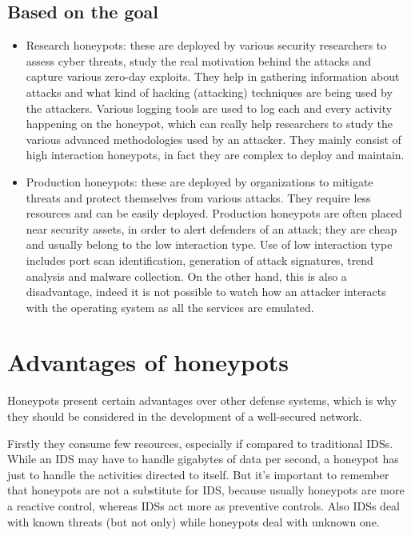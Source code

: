 \documentclass[epsfig,a4paper,11pt,titlepage,oneside,openany]{book}
\begin{document}
\section{Based on the goal}

\begin{itemize}
\item Research honeypots: these are deployed by various security researchers to assess cyber threats, study the real motivation behind the attacks and capture various zero-day exploits. They help in gathering information about attacks and what kind of hacking (attacking) techniques are being used by the attackers. Various logging tools are used to log each and every activity happening on the honeypot, which can really help researchers to study the various advanced methodologies used by an attacker. They mainly consist of high interaction honeypots, in fact they are complex to deploy and maintain.

\item Production honeypots: these are deployed by organizations to mitigate threats and protect themselves from various attacks. They require less resources and can be easily deployed. Production honeypots are often placed near security assets, in order to alert defenders of an attack; they are cheap and usually belong to the low interaction type. Use of low interaction type includes port scan identification, generation of attack signatures, trend analysis and malware collection. On the other hand, this is also a disadvantage, indeed it is not possible to watch how an attacker interacts with the operating system as all the services are emulated.

\end{itemize}

\chapter{Advantages of honeypots}
Honeypots present certain advantages over other defense systems, which is why they should be considered in the development of a well-secured network.

Firstly they consume few resources, especially if compared to traditional IDSs. While an IDS may have to handle gigabytes of data per second, a honeypot has just to handle the activities directed to itself. But it’s important to remember that honeypots are not a substitute for IDS, because usually honeypots are more a reactive control, whereas IDSs act more as preventive controls. Also IDSs deal with known threats (but not only) while honeypots deal with unknown one.
\end{document}
